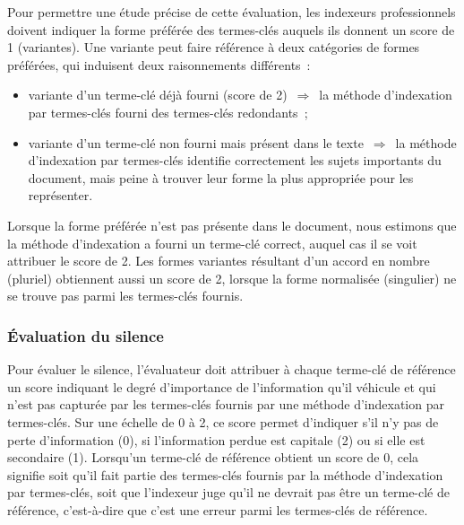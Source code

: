         Pour permettre une étude précise de cette évaluation, les indexeurs
        professionnels doivent indiquer la forme préférée des termes-clés
        auquels ils donnent un score de 1 (variantes). Une variante peut faire
        référence à deux catégories de formes préférées, qui induisent deux
        raisonnements différents~:
        \begin{itemize}
          \item{variante d'un terme-clé déjà fourni (score de
                2)~$\Rightarrow$~la méthode d'indexation par termes-clés fourni
                des termes-clés redondants~;}
          \item{variante d'un terme-clé non fourni mais présent dans le
              texte~$\Rightarrow$~la méthode d'indexation par termes-clés
                identifie correctement les sujets importants du document, mais
                peine à trouver leur forme la plus appropriée pour les
                représenter.}
        \end{itemize}

        Lorsque la forme préférée n'est pas présente dans le document, nous
        estimons que la méthode d'indexation a fourni un terme-clé correct,
        auquel cas il se voit attribuer le score de 2. Les formes variantes
        résultant d'un accord en nombre (pluriel) obtiennent aussi un score de
        2, lorsque la forme normalisée (singulier) ne se trouve pas parmi les
        termes-clés fournis.

      \subsubsection{Évaluation du silence}
      \label{subsubsec:main-automatic_evaluation_of_keyphrase_annotation-methodology-evaluation_protocol-silence}
        Pour évaluer le silence, l'évaluateur doit attribuer à chaque terme-clé
        de référence un score indiquant le degré d'importance de l'information
        qu'il véhicule et qui n'est pas capturée par les termes-clés fournis par
        une méthode d'indexation par termes-clés. Sur une échelle de 0 à 2, ce
        score permet d'indiquer s'il n'y pas de perte d'information (0), si
        l'information perdue est capitale (2) ou si elle est secondaire (1).
        Lorsqu'un terme-clé de référence obtient un score de 0, cela signifie
        soit qu'il fait partie des termes-clés fournis par la méthode
        d'indexation par termes-clés, soit que l'indexeur juge qu'il ne devrait
        pas être un terme-clé de référence, c'est-à-dire que c'est une erreur
        parmi les termes-clés de référence.

